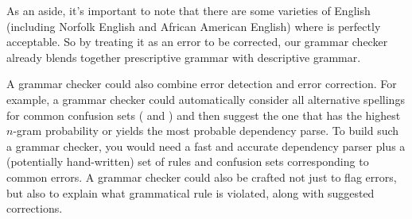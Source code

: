 
As an aside, it's important to note that there are some varieties of English (including Norfolk English and African American English) where  is perfectly acceptable.  So by treating it as an error to be corrected, our grammar checker already blends together prescriptive grammar with descriptive grammar.

 A grammar checker could also combine error detection and error correction.
 For example, a grammar checker could automatically consider all alternative spellings for common confusion sets ( and ) and then suggest the one that has the highest $n$-gram probability or yields the most probable dependency parse.  To build such a grammar checker, you would need a fast and accurate dependency parser plus a (potentially hand-written) set of rules and confusion sets corresponding to common errors.  A grammar checker could also be crafted not just to flag errors, but also to explain what grammatical rule is violated, along with suggested corrections.





